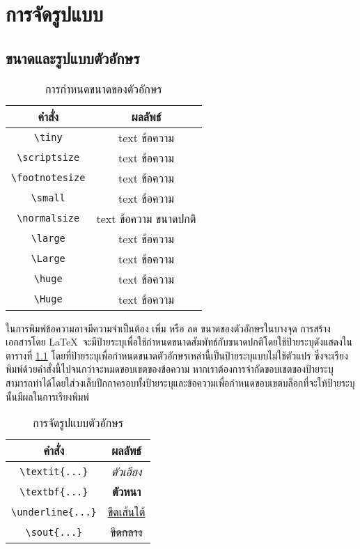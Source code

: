 \chapter{การจัดรูปแบบ}

\section{ขนาดและรูปแบบตัวอักษร}
\label{Subsect:Font}
\begin{table}[h]
	\center
	\caption{การกำหนดขนาดของตัวอักษร}
	\begin{tabular}{|c|c|}
		\hline
		คำสั่ง	& ผลลัพธ์ \\
		\hline
		\lstinline|\tiny|	& \tiny text ข้อความ  \\
		\lstinline|\scriptsize|	& \scriptsize text ข้อความ \\
		\lstinline|\footnotesize|	& \footnotesize text ข้อความ \\
		\lstinline|\small|	& \small text ข้อความ \\
		\lstinline|\normalsize|	& {\normalsize text ข้อความ} ขนาดปกติ \\
		\lstinline|\large|	& \large text ข้อความ \\
		\lstinline|\Large|	& \Large text ข้อความ \\
		\lstinline|\huge|	& \huge text ข้อความ \\
		\lstinline|\Huge|	& \Huge text ข้อความ \\
		\hline
	\end{tabular}
	\label{Table:FontSize}
\end{table}

ในการพิมพ์ข้อความอาจมีความจำเป็นต้อง {\Large เพิ่ม} หรือ {\scriptsize ลด} ขนาดของตัวอักษรในบางจุด การสร้างเอกสารโดย \LaTeX~จะมีป้ายระบุเพื่อใช้กำหนดขนาดสัมพัทธ์กับขนาดปกติโดยใช้ป้ายระบุดังแสดงในตารางที่ \ref{Table:FontSize}
โดยที่ป้ายระบุเพื่อกำหนดขนาดตัวอักษรเหล่านี้เป็นป้ายระบุแบบไม่ใช้ตัวแปร ซึ่งจะเรียงพิมพ์ด้วยคำสั่งนี้ไปจนกว่าจะหมดขอบเขตของข้อความ หากเราต้องการจำกัดขอบเขตของป้ายระบุสามารถทำได้โดยใส่วงเล็บปีกกาครอบทั้งป้ายระบุและข้อความเพื่อกำหนดขอบเขตบล็อกที่จะให้ป้ายระบุนั้นมีผลในการเรียงพิมพ์

\begin{table}
	\center
	\caption{การจัดรูปแบบตัวอักษร}
	\begin{tabular}{|c|c|}
		\hline
		คำสั่ง		& ผลลัพธ์ \\
		\hline
		\lstinline|\textit{...}| 	& \textit{ตัวเอียง} \\
		\lstinline|\textbf{...}| 	& \textbf{ตัวหนา} \\
		\lstinline|\underline{...}| 	& \underline{ขีดเส้นใต้} \\
		\lstinline|\sout{...}| 	& \sout{ขีดกลาง} \\
		\hline
	\end{tabular}
	\label{Table:TextFormat}
\end{table}

